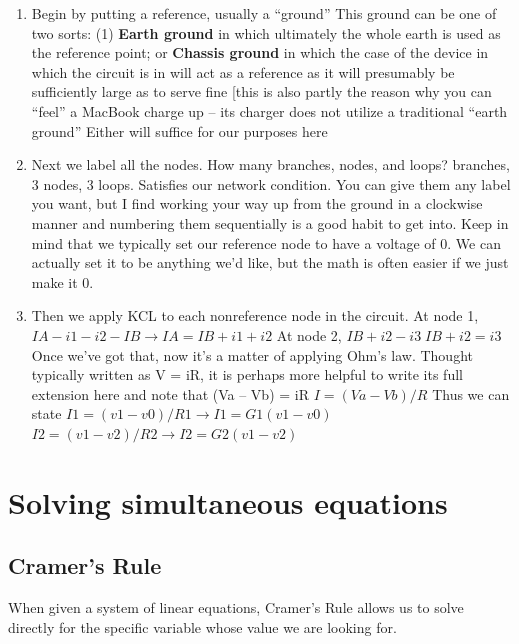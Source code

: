 \documentclass[11pt]{book}
\begin{document}
\begin{enumerate}
	\item Begin by putting a reference, usually a ``ground''
	\subitem This ground can be one of two sorts: (1) \textbf{Earth ground} in which ultimately the whole earth is used as the reference point; or \textbf{Chassis ground} in which the case of the device in which the circuit is in will act as a reference as it will presumably be sufficiently large as to serve fine [this is also partly the reason why you can ``feel'' a MacBook charge up – its charger does not utilize a traditional ``earth ground''
	\subitem Either will suffice for our purposes here
	\item Next we label all the nodes.
	\subitem How many branches, nodes, and loops?
	 branches, 3 nodes, 3 loops. Satisfies our network condition. 
	\subitem You can give them any label you want, but I find working your way up from the ground in a clockwise manner and numbering them sequentially is a good habit to get into.
	\subitem Keep in mind that we typically set our reference node to have a voltage of 0. We can actually set it to be anything we’d like, but the math is often easier if we just make it 0.
	\item Then we apply KCL to each nonreference node in the circuit.
	\subitem At node 1, $IA - i1 - i2 - IB \rightarrow IA = IB + i1 + i2$
	\subitem At node 2, $IB + i2 - i3  IB + i2 = i3$
	\subitem Once we’ve got that, now it’s a matter of applying Ohm’s law. Thought typically written as V = iR, it is perhaps more helpful to write its full extension here and note that (Va – Vb) = iR
	\subsubitem $I = (Va - Vb)/R$
	\subitem Thus we can state
	\subsubitem $I1 = (v1 - v0)/R1 	\rightarrow I1 = G1(v1 - v0)$
	\subsubitem $I2 = (v1 - v2)/R2 \rightarrow I2 = G2(v1 - v2)$

\end{enumerate}





\section{Solving simultaneous equations}
\subsection{Cramer's Rule}
When given a system of linear equations, Cramer's Rule allows us to solve directly for the specific variable whose value we are looking for.
\end{document}
